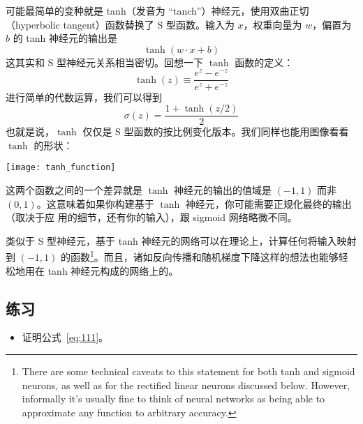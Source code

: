 可能最简单的变种就是 tanh（发音为 “tanch”）神经元，使用双曲正切（hyperbolic
  tangent）函数替换了 S 型函数。输入为 $x$，权重向量为 $w$，偏置为 $b$ 的
tanh 神经元的输出是
\begin{equation}
  \tanh(w \cdot x+b)
  \label{eq:109}\tag{109}
\end{equation}
这其实和 S 型神经元关系相当密切。回想一下 $\tanh$ 函数的定义：
\begin{equation}
  \tanh(z) \equiv \frac{e^z-e^{-z}}{e^z+e^{-z}}
  \label{eq:110}\tag{110}
\end{equation}
进行简单的代数运算，我们可以得到
\begin{equation} 
  \sigma(z) = \frac{1+\tanh(z/2)}{2}
  \label{eq:111}\tag{111}
\end{equation}
也就是说，$\tanh$ 仅仅是 S 型函数的按比例变化版本。我们同样也能用图像看看
$\tanh$ 的形状：
\begin{center}
  \texttt{[image: tanh\_function]}
\end{center}

这两个函数之间的一个差异就是 $\tanh$ 神经元的输出的值域是 $(-1, 1)$ 而非 $(0,
1)$。这意味着如果你构建基于 $\tanh$ 神经元，你可能需要正规化最终的输出（取决于应
  用的细节，还有你的输入），跟 sigmoid 网络略微不同。

类似于 S 型神经元，基于 tanh 神经元的网络可以在理论上，计算任何将输入映射到
$(-1, 1)$ 的函数\footnote{There are some technical caveats to this statement for both tanh and sigmoid neurons, as well as for the rectified linear neurons discussed below. However, informally it's usually fine to think of neural networks as being able to approximate any function to arbitrary accuracy.}。而且，诸如反向传播和随机梯度下降这样的想法也能够轻松地用在
tanh 神经元构成的网络上的。

\subsection*{练习}

\begin{itemize}
\item 证明公式~\eqref{eq:111}。
\end{itemize}

